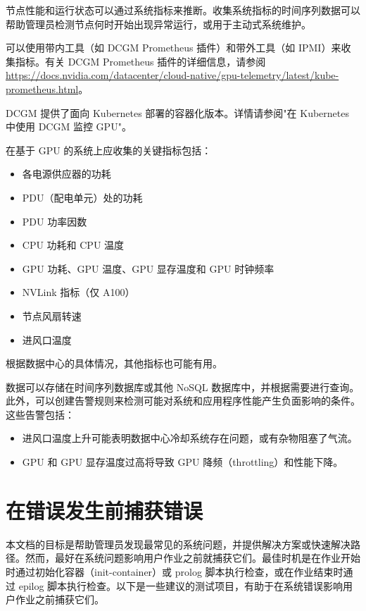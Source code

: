 \documentclass[11pt,UTF8,fontset=fandol,openany]{ctexrep}
\begin{document}
节点性能和运行状态可以通过系统指标来推断。收集系统指标的时间序列数据可以帮助管理员检测节点何时开始出现异常运行，或用于主动式系统维护。

可以使用带内工具（如 DCGM Prometheus 插件）和带外工具（如 IPMI）来收集指标。有关 DCGM Prometheus 插件的详细信息，请参阅 \url{https://docs.nvidia.com/datacenter/cloud-native/gpu-telemetry/latest/kube-prometheus.html}。

DCGM 提供了面向 Kubernetes 部署的容器化版本。详情请参阅"在 Kubernetes 中使用 DCGM 监控 GPU"。

在基于 GPU 的系统上应收集的关键指标包括：

\begin{itemize}
  \item 各电源供应器的功耗
  \item PDU（配电单元）处的功耗
  \item PDU 功率因数
  \item CPU 功耗和 CPU 温度
  \item GPU 功耗、GPU 温度、GPU 显存温度和 GPU 时钟频率
  \item NVLink 指标（仅 A100）
  \item 节点风扇转速
  \item 进风口温度
\end{itemize}

根据数据中心的具体情况，其他指标也可能有用。

数据可以存储在时间序列数据库或其他 NoSQL 数据库中，并根据需要进行查询。此外，可以创建告警规则来检测可能对系统和应用程序性能产生负面影响的条件。这些告警包括：

\begin{itemize}
  \item 进风口温度上升可能表明数据中心冷却系统存在问题，或有杂物阻塞了气流。
  \item GPU 和 GPU 显存温度过高将导致 GPU 降频（throttling）和性能下降。
\end{itemize}

\section{在错误发生前捕获错误}

本文档的目标是帮助管理员发现最常见的系统问题，并提供解决方案或快速解决路径。然而，最好在系统问题影响用户作业之前就捕获它们。最佳时机是在作业开始时通过初始化容器（init-container）或 prolog 脚本执行检查，或在作业结束时通过 epilog 脚本执行检查。以下是一些建议的测试项目，有助于在系统错误影响用户作业之前捕获它们。
\end{document}
